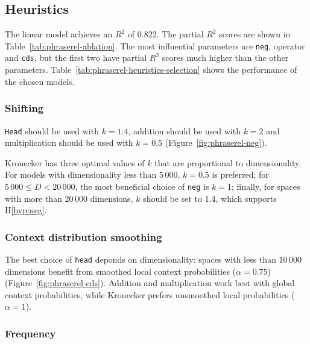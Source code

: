 \subsection{Heuristics}
\label{sec:heuristics-phraserel}



The linear model achieves an $R^2$ of 0.822. The partial $R^2$ scores are shown in Table~\ref{tab:phraserel-ablation}. The most influential parameters are \texttt{neg}, operator and \texttt{cds}, but the first two have partial $R^2$ scores much higher than the other parameters. Table~\ref{tab:phraserel-heuristics-selection} shows the performance of the chosen models.

\subsubsection{Shifting}
\label{sec:shifting-phraserel}



\texttt{Head} should be used with $k = 1.4$, addition should be used with $k = 2$ and multiplication should be used with $k = 0.5$ (Figure~\ref{fig:phraserel-neg}).

Kronecker has three optimal values of $k$ that are proportional to dimensionality. For models with dimensionality less than 5\,000, $k = 0.5$ is preferred; for $5\,000 \leq D < 20\,000$, the most beneficial choice of \texttt{neg} is $k = 1$; finally, for spaces with more than 20\,000 dimensions, $k$ should be set to 1.4, which supports H\ref{hyp:neg}.

\subsubsection{Context distribution smoothing}
\label{sec:cont-distr-smooth-phraserel}

The best choice of \texttt{head} deponds on dimensionality: spaces with less than 10\,000 dimensions benefit from smoothed local context probabilities ($\alpha = 0.75$) (Figure~\ref{fig:phraserel-cds}). Addition and multiplication work best with global context probabilities, while Kronecker prefers unsmoothed local probabilities ($\alpha = 1$).

\subsubsection{Frequency}
\label{sec:frequency-phraserel}

